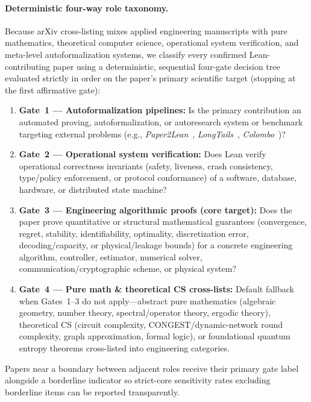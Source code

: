 \documentclass[11pt,letterpaper]{article}
\begin{document}
\paragraph{Deterministic four-way role taxonomy.}
Because arXiv cross-listing mixes applied engineering manuscripts with pure mathematics, theoretical computer science, operational system verification, and meta-level autoformalization systems, we classify every confirmed Lean-contributing paper using a deterministic, sequential four-gate decision tree evaluated strictly in order on the paper's primary scientific target (stopping at the first affirmative gate):
\begin{enumerate}
  \item \textbf{Gate~1 --- Autoformalization pipelines:} Is the primary contribution an automated proving, autoformalization, or autoresearch system or benchmark targeting external problems (e.g., \emph{Paper2Lean}~\cite{arxiv2611_26272}, \emph{LongTails}~\cite{arxiv2611_13872}, \emph{Colombo}~\cite{arxiv2611_23080})?
  \item \textbf{Gate~2 --- Operational system verification:} Does Lean verify operational correctness invariants (safety, liveness, crash consistency, type/policy enforcement, or protocol conformance) of a software, database, hardware, or distributed state machine?
  \item \textbf{Gate~3 --- Engineering algorithmic proofs (core target):} Does the paper prove quantitative or structural mathematical guarantees (convergence, regret, stability, identifiability, optimality, discretization error, decoding/capacity, or physical/leakage bounds) for a concrete engineering algorithm, controller, estimator, numerical solver, communication/cryptographic scheme, or physical system?
  \item \textbf{Gate~4 --- Pure math \& theoretical CS cross-lists:} Default fallback when Gates~1--3 do not apply---abstract pure mathematics (algebraic geometry, number theory, spectral/operator theory, ergodic theory), theoretical CS (circuit complexity, CONGEST/dynamic-network round complexity, graph approximation, formal logic), or foundational quantum entropy theorems cross-listed into engineering categories.
\end{enumerate}
Papers near a boundary between adjacent roles receive their primary gate label alongside a borderline indicator so strict-core sensitivity rates excluding borderline items can be reported transparently.
\end{document}
